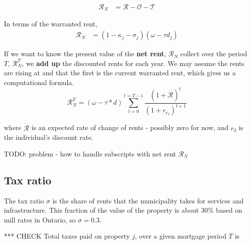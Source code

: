 \begin{align}
\mathcal{R}_N &= \mathcal{R} - \mathcal{O} - \mathcal{T} 
\end{align}

In terms of the warranted rent, 
\begin{align}
\mathcal{R}_N &= (1-\kappa_j - \sigma_j)(\omega - \tau d_j)
\end{align}




If we want to know the  present value  of the \textbf{net rent}, $\mathcal{R}_N$  collect over the period  $T$, $\mathcal{R}_N^T$, we \textbf{add up} the discounted rents for each year. We may assume the rents are rising at and that the first is the current warranted rent, which gives us a computational formula. 
\[\mathcal{R}_N^T= (\omega-\tau*d)\sum_{t=0}^{t=T-1} \frac{(1+\dot{\mathcal{R}})^{t}} {(1+r_{r_\delta})^{t+1}} \]

\noindent where $\dot{\mathcal{R}}$ is an expected rate of change of rents - possibly zero for now, and $r_\delta$ is the individual's discount rate. 

TODO: problem - how to handle subscripts with net rent $\mathcal{R}_N$


\subsection{Tax ratio}\label{SS:TaxRatio} 
The tax ratio $\sigma$ is the share of rents that the municipality takes for services and infrastructure. This fraction of the value of the property is about 30\% based on mill rates in Ontario,  so $\sigma = 0.3$. %

*** CHECK Total taxes paid on  property $j$, over a given mortgage period $T$ is 

